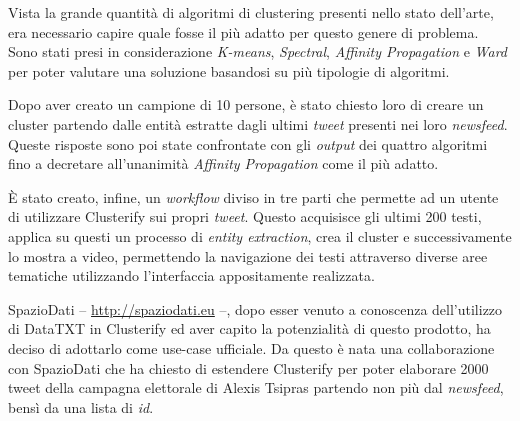 Vista la grande quantità di algoritmi di clustering presenti nello stato dell'arte, era necessario capire quale fosse il più adatto per questo genere di problema. Sono stati presi in considerazione \emph{K-means}, \emph{Spectral}, \emph{Affinity Propagation} e \emph{Ward} per poter valutare una soluzione basandosi su più tipologie di algoritmi. 

Dopo aver creato un campione di 10 persone, è stato chiesto loro di creare un cluster partendo dalle entità estratte dagli ultimi \emph{tweet} presenti nei loro \emph{newsfeed}. Queste risposte sono poi state confrontate con gli \emph{output} dei quattro algoritmi fino a decretare all'unanimità \emph{Affinity Propagation} come il più adatto.

È stato creato, infine, un \emph{workflow} diviso in tre parti che permette ad un utente di utilizzare Clusterify sui propri \emph{tweet}. Questo acquisisce gli ultimi 200 testi, applica su questi un processo di \emph{entity extraction}, crea il cluster e successivamente lo mostra a video, permettendo la navigazione dei testi attraverso diverse aree tematiche utilizzando l'interfaccia appositamente realizzata.

SpazioDati -- \url{http://spaziodati.eu} --, dopo esser venuto a conoscenza dell'utilizzo di DataTXT in Clusterify ed aver capito la potenzialità di questo prodotto, ha deciso di adottarlo come use-case ufficiale. Da questo è nata una collaborazione con SpazioDati che ha chiesto di estendere Clusterify per poter elaborare 2000 tweet della campagna elettorale di Alexis Tsipras partendo non più dal \emph{newsfeed}, bensì da una lista di \emph{id}.
